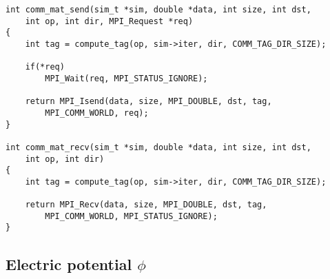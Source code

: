 \begin{lstlisting}
int comm_mat_send(sim_t *sim, double *data, int size, int dst,
	int op, int dir, MPI_Request *req)
{
	int tag = compute_tag(op, sim->iter, dir, COMM_TAG_DIR_SIZE);

	if(*req)
		MPI_Wait(req, MPI_STATUS_IGNORE);

	return MPI_Isend(data, size, MPI_DOUBLE, dst, tag,
		MPI_COMM_WORLD, req);
}

int comm_mat_recv(sim_t *sim, double *data, int size, int dst,
	int op, int dir)
{
	int tag = compute_tag(op, sim->iter, dir, COMM_TAG_DIR_SIZE);

	return MPI_Recv(data, size, MPI_DOUBLE, dst, tag,
		MPI_COMM_WORLD, MPI_STATUS_IGNORE);
}
\end{lstlisting}

\subsection{Electric potential $\phi$}

